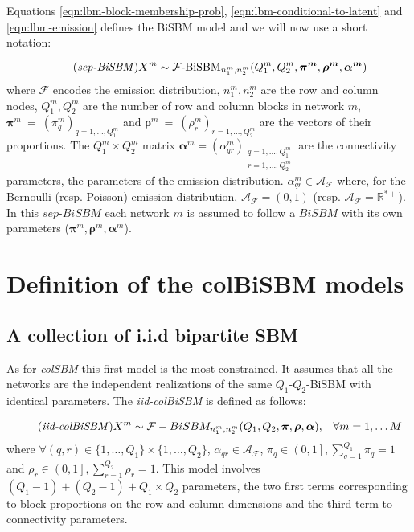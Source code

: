 \documentclass[12pt,a4paper]{report}
\begin{document}
Equations \eqref{eqn:lbm-block-membership-prob}, \eqref{eqn:lbm-conditional-to-latent}
and \eqref{eqn:lbm-emission} defines the BiSBM model and we will now use a short
notation:

\begin{equation}
    \tag{\emph{sep-BiSBM}}
    X^m \sim \mathcal{F}\text{-BiSBM}_{n_1^m,n_2^m}(Q_1^m, Q_2^m, \bm{\pi^m}, \bm{\rho^m}, \bm{\alpha^m})
\end{equation}
where $\mathcal{F}$ encodes the emission distribution, $n_1^m,n_2^m$ are the row
and column nodes, $Q_1^m, Q_2^m$ are the number of row and column blocks in
network $m$, $\bm{\pi}^m~=~{(\pi^m_q)}_{q=1,\dots,Q_1^m}$ and
$\bm{\rho}^m~=~{(\rho^m_r)}_{r=1,\dots,Q_2^m}$ are the vectors  of their
proportions. The $Q_1^m \times Q_2^m$ matrix
$\bm{\alpha}^m = {(\alpha^m_{qr})}_{\substack{q = 1,\dots,Q_1^m \\ r = 1,\dots,Q_2^m}}$
are the connectivity parameters, the parameters of the emission distribution.
$\alpha^m_{qr}\in\mathcal{A}_{\mathcal{F}}$ where, for the Bernoulli
(resp. Poisson) emission distribution, $\mathcal{A}_{\mathcal{F}} = (0,1)$ (resp.
$\mathcal{A}_{\mathcal{F}} = \mathbb{R}^{*+}$). In this $sep$-$BiSBM$ each
network $m$ is assumed to follow a $BiSBM$ with its own parameters ($\bm{\pi}^m,
\bm{\rho}^m, \bm{\alpha}^m$).

\section{Definition of the colBiSBM models}\label{sec:definition-of-the-colbisbm-models}

\subsection{A collection of i.i.d bipartite SBM}\label{ssec:a-collection-of-i-i-d-bipartite-sbm}
As for \emph{colSBM} this first model is the most constrained. It assumes
that all the networks are the independent realizations of the same $Q_1$-$Q_2$-BiSBM
with identical parameters. The \emph{iid-colBiSBM} is defined as follows:

\begin{align}
    \tag{\emph{iid-colBiSBM}}
    X^m \sim \mathcal{F}-BiSBM_{n_1^m,n_2^m} (Q_1, Q_2, \bm{\pi}, \bm{\rho}, \bm{\alpha}), && \forall m = 1, \dots M
\end{align}
where $\forall (q,r) \in \{1,\dots,Q_1\}\times\{1,\dots,Q_2\}$, $\alpha_{qr} \in \mathcal{A}_{\mathcal{F}}$,
$\pi_q \in \left( 0,1 \right], \sum_{q=1}^{Q_1} \pi_q = 1 $ and $\rho_r \in \left( 0,1 \right], \sum_{r=1}^{Q_2} \rho_r = 1 $.
This model involves $(Q_1 - 1) + (Q_2 - 1) + Q_1\times Q_2$ parameters, the two
first terms corresponding to block proportions on the row and column dimensions
and the third term to connectivity parameters.
\end{document}
